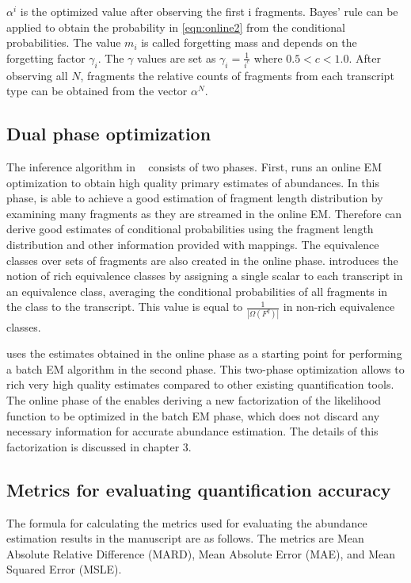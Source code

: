 $\alpha^i$ is the optimized value after observing the first i fragments. 
Bayes' rule can be applied to obtain the probability in \cref{eqn:online2} 
from the conditional probabilities. The value $m_i$ is called forgetting 
mass and depends on the forgetting factor $\gamma_i$. The $\gamma$ values 
are set as $\gamma_i=\frac{1}{i^c}$ where $0.5<c<1.0$. After observing 
all $N$, fragments the relative counts of fragments from each transcript type 
can be obtained from the vector $\alpha^N$.

\subsection{Dual phase optimization}
The inference algorithm in \salmon~\citep{Patro2017Salmon} consists of two phases. 
First, \salmon runs an online EM optimization to obtain high quality primary 
estimates of abundances. In this phase, \salmon is able to achieve a good 
estimation of fragment length distribution by examining many fragments as 
they are streamed in the online EM. Therefore \salmon can derive good estimates 
of conditional probabilities using the fragment length distribution and other 
information provided with mappings. The equivalence classes over sets of 
fragments are also created in the online phase. \salmon introduces the notion 
of rich equivalence classes by assigning a single scalar to each transcript in 
an equivalence class, averaging the conditional probabilities of all fragments 
in the class to the transcript. This value is equal to $\frac{1}{|\Omega{(F^q)}|}$ 
in non-rich equivalence classes. 

\salmon uses the estimates obtained in the online phase as a starting point 
for performing a batch EM algorithm in the second phase. This two-phase 
optimization allows \salmon to rich very high quality estimates compared 
to other existing quantification tools. The online phase of the \salmon 
enables deriving a new factorization of the likelihood function to be 
optimized in the batch EM phase, which does not discard any necessary 
information for accurate abundance estimation. The details of this 
factorization is discussed in chapter 3.

\subsection{Metrics for evaluating quantification accuracy}
The formula for calculating the metrics used for evaluating the 
abundance estimation results in the manuscript are as follows. 
The metrics are Mean Absolute Relative Difference (MARD), Mean Absolute
Error (MAE), and Mean Squared Error (MSLE).

